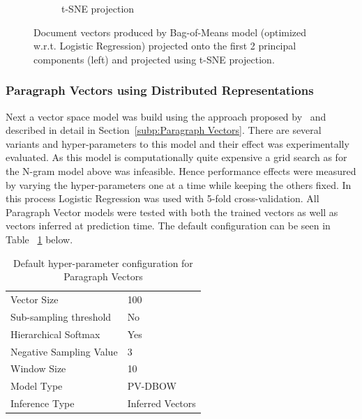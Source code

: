 \begin{figure}[h!]
\begin{subfigure}[b]{0.48\textwidth}
      \caption{t-SNE projection}
\label{fig:bom-tsne}
    \end{subfigure}
    \caption{Document vectors produced by Bag-of-Means model (optimized w.r.t. Logistic Regression) projected onto the first 2 principal components (left) and projected using t-SNE projection. }
\label{fig:bom}
\end{figure}

\subsubsection{Paragraph Vectors using Distributed Representations}
\label{subs:Paragraph Vectors using Distributed Representations}


Next a vector space model was build using the approach proposed by~\cite{Le:2014aa} and described in detail in Section~\ref{subp:Paragraph Vectors}. There are several variants and hyper-parameters to this model and their effect was experimentally evaluated. As this model is computationally quite expensive a grid search as for the N-gram model above was infeasible. Hence performance effects were measured by varying the hyper-parameters one at a time while keeping the others fixed. In this process Logistic Regression was used with 5-fold cross-validation. All Paragraph Vector models were tested with both the trained vectors as well as vectors inferred at prediction time. The default configuration can be seen in Table ~\ref{tab:Paragraph Vector Defaults} below.

\begin{table}[h]
  \begin{center}
  \begin{tabular}{ l | l }
    \toprule
    Vector Size & 100 \\
    Sub-sampling threshold & No \\
    Hierarchical Softmax & Yes \\
    Negative Sampling Value & 3 \\
    Window Size & 10 \\
    Model Type & PV-DBOW \\
    Inference Type & Inferred Vectors \\
    \bottomrule
  \end{tabular}
  \caption{Default hyper-parameter configuration for Paragraph Vectors}
  \label{tab:Paragraph Vector Defaults}
\end{center}
\end{table}

